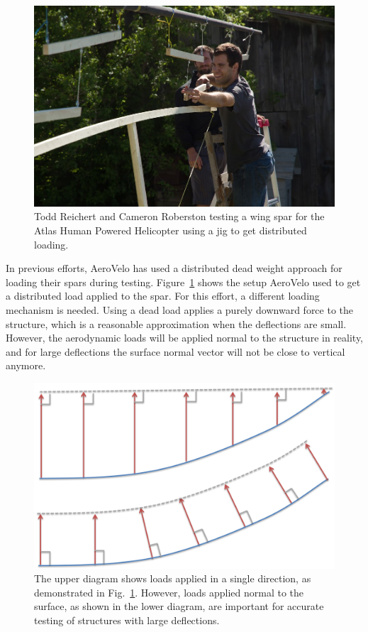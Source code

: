 \documentclass[]{aiaa-tc}
\begin{document}
        \begin{figure}
            \centering
            \includegraphics[width=.5\textwidth]{images/structural_test}
            \caption{Todd Reichert and Cameron Roberston testing a wing spar for the Atlas Human Powered Helicopter using a
            jig to get distributed loading. }
            \label{fig:spar-load-test}
        \end{figure}

        In previous efforts, AeroVelo has used a distributed dead weight approach for loading their spars during testing. 
        Figure~\ref{fig:spar-load-test} shows the setup AeroVelo used to get a distributed load applied to the spar. 
        For this effort, a different loading mechanism is needed. Using a dead load applies a purely downward force to the 
        structure, which is a reasonable approximation when the deflections are small. However, the aerodynamic loads will 
        be applied normal to the structure in reality, and for large deflections the surface normal vector will not be 
        close to vertical anymore. 

        \begin{figure}[!htbp]
            \centering
            \includegraphics[width=.75\textwidth]{images/follower_force}
            \caption{The upper diagram shows loads applied in a single direction, as demonstrated in Fig.~\ref{fig:spar-load-test}. However, loads applied normal to the surface, as shown in the lower diagram, are important for accurate testing of structures with large deflections.}
            \label{fig:follower-force}
        \end{figure}
\end{document}
